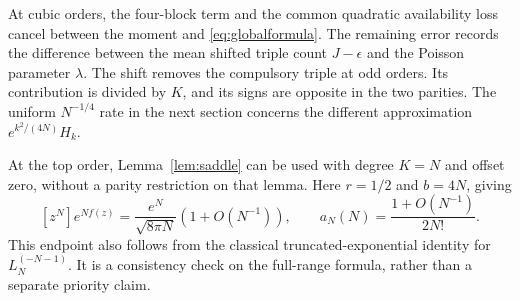 \documentclass[11pt]{article}
\theoremstyle{definition}
\theoremstyle{remark}
\newcommand{\1}{\mathbf 1}
\begin{document}
At cubic orders, the four-block term and the common quadratic availability loss cancel between the moment and \eqref{eq:globalformula}. The remaining error records the difference between the mean shifted triple count $J-\epsilon$ and the Poisson parameter $\lambda$. The shift removes the compulsory triple at odd orders. Its contribution is divided by $K$, and its signs are opposite in the two parities. The uniform $N^{-1/4}$ rate in the next section concerns the different approximation $e^{k^2/(4N)}H_k$.

At the top order, Lemma~\ref{lem:saddle} can be used with degree $K=N$ and offset zero, without a parity restriction on that lemma. Here $r=1/2$ and $b=4N$, giving
\[
[z^N]e^{Nf(z)}=\frac{e^N}{\sqrt{8\pi N}}(1+O(N^{-1})),\qquad
a_N(N)=\frac{1+O(N^{-1})}{2N!}.
\]
This endpoint also follows from the classical truncated-exponential identity for $L_N^{(-N-1)}$. It is a consistency check on the full-range formula, rather than a separate priority claim.
\end{document}
